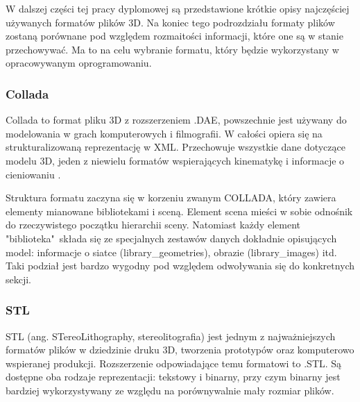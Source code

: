 W dalszej części tej pracy dyplomowej są przedstawione krótkie opisy najczęściej używanych formatów plików 3D. Na koniec tego podrozdziału formaty plików zostaną porównane pod względem rozmaitości informacji, które one są w stanie przechowywać. Ma to na celu wybranie formatu, który będzie wykorzystany w opracowywanym oprogramowaniu.

\subsubsection{Collada}
Collada to format pliku 3D z rozszerzeniem .DAE, powszechnie jest używany do modelowania w grach komputerowych i filmografii. W całości opiera się na strukturalizowaną reprezentację w XML. Przechowuje wszystkie dane dotyczące modelu 3D, jeden z niewielu formatów wspierających kinematykę i informacje o cieniowaniu \cite{colladaInfo}.

Struktura formatu zaczyna się w korzeniu zwanym COLLADA, który zawiera elementy mianowane bibliotekami i sceną. Element scena mieści w sobie odnośnik do rzeczywistego początku hierarchii sceny. Natomiast każdy element "biblioteka"\ składa się ze specjalnych zestawów danych dokładnie opisujących model: informacje o siatce (library\_geometries), obrazie (library\_images) itd. Taki podział jest bardzo wygodny pod względem odwoływania się do konkretnych sekcji.  

\subsubsection{STL}
STL (ang. STereoLithography, stereolitografia) jest jednym z najważniejszych formatów plików w dziedzinie druku 3D, tworzenia prototypów oraz komputerowo wspieranej produkcji. Rozszerzenie odpowiadające temu formatowi to .STL. Są dostępne oba rodzaje reprezentacji: tekstowy i binarny, przy czym binarny jest bardziej wykorzystywany ze względu na porównywalnie mały rozmiar plików. 

